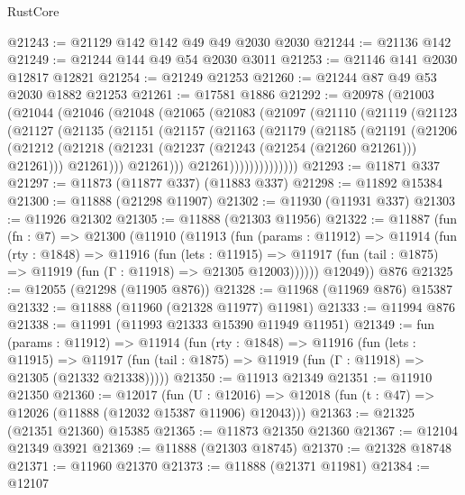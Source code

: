 \begin{lexlean}{RustCore}
\begin{coremodule}
@21243 := @21129 @142 @142 @49 @49 @2030 @2030
@21244 := @21136 @142
@21249 := @21244 @144 @49 @54 @2030 @3011
@21253 := @21146 @141 @2030 @12817 @12821
@21254 := @21249 @21253
@21260 := @21244 @87 @49 @53 @2030 @1882 @21253
@21261 := @17581 @1886
@21292 := @20978
    (@21003
      (@21044
        (@21046
          (@21048
            (@21065
              (@21083
                (@21097
                  (@21110
                    (@21119
                      (@21123
                        (@21127
                          (@21135
                            (@21151
                              (@21157
                                (@21163
                                  (@21179
                                    (@21185
                                      (@21191
                                        (@21206
                                          (@21212
                                            (@21218
                                              (@21231
                                                (@21237 (@21243 (@21254 (@21260 @21261))) @21261)))
                                            @21261)))
                                      @21261)))
                                @21261))))))))))))))
@21293 := @11871 @337
@21297 := @11873 (@11877 @337) (@11883 @337)
@21298 := @11892 @15384
@21300 := @11888 (@21298 @11907)
@21302 := @11930 (@11931 @337)
@21303 := @11926 @21302
@21305 := @11888 (@21303 @11956)
@21322 := @11887
    (fun (fn : @7) =>
    @21300
      (@11910
        (@11913
          (fun (params : @11912) =>
          @11914
            (fun (rty : @1848) =>
            @11916
              (fun (lets : @11915) =>
              @11917 (fun (tail : @1875) => @11919 (fun (Γ : @11918) => @21305 @12003))))))
        @12049))
    @876
@21325 := @12055 (@21298 (@11905 @876))
@21328 := @11968 (@11969 @876) @15387
@21332 := @11888 (@11960 (@21328 @11977) @11981)
@21333 := @11994 @876
@21338 := @11991 (@11993 @21333 @15390 @11949 @11951)
@21349 := fun (params : @11912) =>
  @11914
    (fun (rty : @1848) =>
    @11916
      (fun (lets : @11915) =>
      @11917 (fun (tail : @1875) => @11919 (fun (Γ : @11918) => @21305 (@21332 @21338)))))
@21350 := @11913 @21349
@21351 := @11910 @21350
@21360 := @12017
    (fun (U : @12016) => @12018 (fun (t : @47) => @12026 (@11888 (@12032 @15387 @11906) @12043)))
@21363 := @21325 (@21351 @21360) @15385
@21365 := @11873 @21350 @21360
@21367 := @12104 @21349 @3921
@21369 := @11888 (@21303 @18745)
@21370 := @21328 @18748
@21371 := @11960 @21370
@21373 := @11888 (@21371 @11981)
@21384 := @12107

\end{coremodule}
\end{lexlean}
